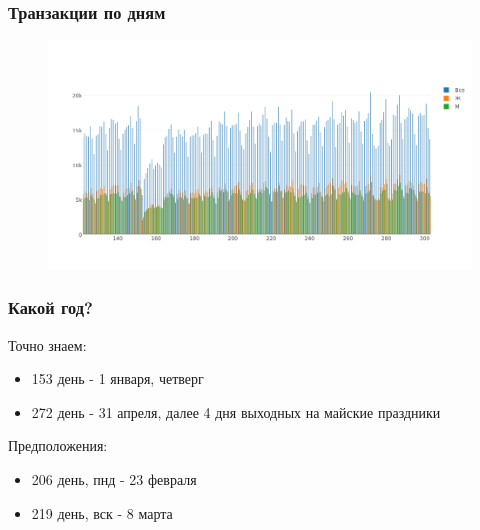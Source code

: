 \documentclass{beamer}
\begin{document}

\begin{frame}
\frametitle{Транзакции по дням}

\begin{figure}
    \includegraphics[width=1\linewidth]{pics/trans_all.png}
\end{figure}


\end{frame}


\begin{frame}
\frametitle{Какой год?}

Точно знаем:
\begin{itemize}
    \item 153 день - 1 января, четверг
    \item 272 день - 31 апреля, далее 4 дня выходных на майские праздники
\end{itemize}

Предположения:
\begin{itemize}
    \item 206 день, пнд - 23 февраля
    \item 219 день, вск - 8 марта
\end{itemize}

\end{frame}

\end{document}
